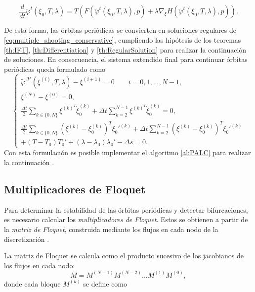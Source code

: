\[
    \dfrac{d}{dt}\tilde{\varphi}^{t}(\xi_0, T, \lambda)
    = T \left( F(\tilde{\varphi}^t(\xi_0, T, \lambda), p)
    + \lambda \nabla_{\xi} H(\tilde{\varphi}^t(\xi_0, T, \lambda), p) \right).
\]

De esta forma, las órbitas periódicas se convierten en soluciones regulares de
\eqref{eq:multiple_shooting_conservative}, cumpliendo las hipótesis de los teoremas \ref{th:IFT}, \ref{th:Differentiation}
y \ref{th:RegularSolution} para realizar la continuación de soluciones. En consecuencia, el sistema extendido final para continuar órbitas periódicas queda
formulado como
\begin{equation}
    \begin{cases}
        \tilde{\varphi}^{\Delta t}(\xi^{(i)}, T, \lambda) - \xi^{(i+1)} = 0 \qquad i = 0, 1, ..., N-1 , \\[1mm]
        \xi^{(N)} - \xi^{(0)} = 0,                                                                      \\[1mm]
        \frac{\Delta t}{2} \sum_{k \in \{0, N\}} \xi^{(k)^T} \dot{\xi}_{0}^{(k)}
        + \Delta t \sum_{k=2}^{N-1} \xi^{(k)^T} \dot{\xi}_{0}^{(k)} = 0,                                \\[1mm]
        \frac{\Delta t}{2} \sum_{k \in \{0, N\}}
        (\xi^{(k)} - \xi_0^{(k)})^{T} \xi_0'^{(k)} +
        \Delta t \sum_{k=2}^{N-1}
        (\xi^{(k)} - \xi_0^{(k)})^{T} \xi_0'^{(k)}                                                      \\
        + (T - T_0) T_0'
        + (\lambda - \lambda_0) \lambda_0'
        - \Delta s = 0.
    \end{cases}
    \label{eq:Orbit_System}
\end{equation}
Con esta formulación es posible implementar el algoritmo \ref{al:PALC} para realizar la continuación \cite{Meijer2011}.


\subsection{Multiplicadores de Floquet}

Para determinar la estabilidad de las órbitas periódicas y detectar bifurcaciones, es necesario calcular los \emph{multiplicadores de Floquet}.
Estos se obtienen a partir de la \emph{matriz de Floquet}, construida mediante los flujos en cada nodo de la discretización \cite{FloquetMultipliers}.

La matriz de Floquet se calcula como el producto sucesivo de los jacobianos de los flujos en cada nodo:
\begin{equation}
    M = M^{(N-1)} M^{(N-2)} \dots M^{(1)} M^{(0)},
\end{equation}
donde cada bloque \(M^{(k)}\) se define como

